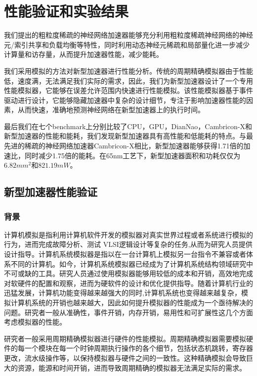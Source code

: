\chapter{性能验证和实验结果}

我们提出的粗粒度稀疏的神经网络加速器能够充分利用粗粒度稀疏神经网络的神经元/索引共享和负载均衡等特性，同时利用动态神经元稀疏和局部量化进一步减少计算量和访存量，从而提升加速器性能，减少能耗。

我们采用模拟的方法对新型加速器进行性能分析。传统的周期精确模拟器由于性能低，速度满，无法满足我们实际的需求，因此，我们为新型加速器设计了一个专用性能模拟器，它能够在误差允许范围内快速进行性能模拟。该性能模拟器基于事件驱动进行设计，它能够隐藏加速器中复杂的设计细节，专注于影响加速器性能的因素，从而快速，准确地预测神经网络在新型加速器上的执行时间。

最后我们在七个benchmark上分别比较了CPU，GPU，DianNao，Cambricon-X和新型加速器的性能和能耗，我们发现新型加速器具有高性能和低能耗的特点。与最先进的稀疏的神经网络加速器Cambricon-X相比，新型加速器能够获得1.71倍的加速比，同时减少1.75倍的能耗。在65nm工艺下，新型加速器面积和功耗仅仅为$6.82mm^2$和$821.19mW$。

\section{新型加速器性能验证}

\subsection{背景}
计算机模拟是指利用计算机软件开发的模拟器对真实世界过程或者系统进行模拟的行为，进而完成故障分析、测试 VLSI逻辑设计等复杂的任务,从而为研究人员提供设计指导。计算机系统模拟器是指以在一台计算机上模拟另一台指令不兼容或者体系不同的计算机。如今，计算机系统模拟器已经成为了计算机系统结构领域研究中不可或缺的工具。研究人员通过使用模拟器能够用较低的成本和开销，高效地完成对软硬件的配置和观察，进而为硬软件的设计和优化提供指导。随着计算机行业的迅猛发展，计算机功能变得越来越强大的同时,计算机系统也变得越来越复杂，模拟计算机系统的开销也越来越大，因此如何提升模拟器的性能成为一个亟待解决的问题。研究者一般从准确性，事件开销，内存开销，易用性和可扩展性这几个方面考虑模拟器的性能。

研究者一般采用周期精确模拟器进行硬件的性能模拟。周期精确模拟器需要模拟硬件的每一个模块在每一个时钟周期执行操作的各个细节，包括状态机跳转，寄存器更改，流水级操作等，以保持模拟器与硬件之间的一致性。这种精确模拟会导致巨大的资源，能源和时间开销，进而导致周期精确的模拟器无法满足实际的需求。

